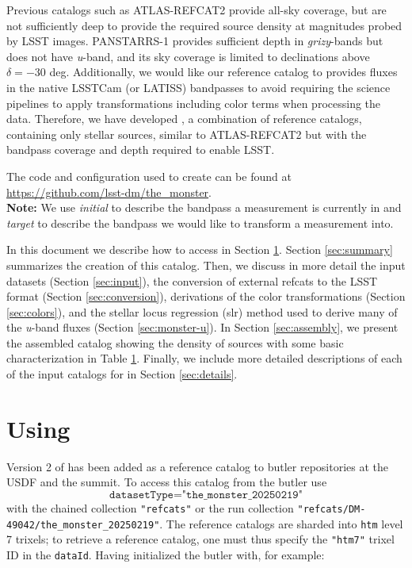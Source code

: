Previous catalogs such as ATLAS-REFCAT2 \citep{Tonry:2018} provide all-sky coverage, but are not sufficiently deep to provide the required source density at magnitudes probed by LSST images.
PANSTARRS-1\citep[PS1;][]{Chambers:2016} provides sufficient depth in \emph{grizy}-bands but does not have \emph{u}-band, and its sky coverage is limited to declinations above $\delta = -30$ deg.
Additionally, we would like our reference catalog to provides fluxes in the native LSSTCam (or LATISS) bandpasses to avoid requiring the science pipelines to apply transformations including color terms when processing the data.
Therefore, we have developed \monster, a combination of reference catalogs, containing only stellar sources, similar to ATLAS-REFCAT2 but with the bandpass coverage and depth required to enable LSST.

The code and configuration used to create \monster can be found at \url{https://github.com/lsst-dm/the_monster}.\\

\textbf{Note:} We use \emph{initial} to describe the bandpass a measurement is currently in and \emph{target} to describe the bandpass we would like to transform a measurement into.

In this document we describe how to access \monster in Section \ref{sec:using}. Section \ref{sec:summary} summarizes the creation of this catalog. 
Then, we discuss in more detail the input datasets (Section \ref{sec:input}), the conversion of external refcats to the LSST format (Section \ref{sec:conversion}), derivations of the color transformations (Section \ref{sec:colors}), and the stellar locus regression (slr) method used to derive many of the \emph{u}-band fluxes (Section \ref{sec:monster-u}).
In Section \ref{sec:assembly}, we present the assembled catalog showing the density of sources with some basic characterization in Table \hyperref[tab:summary]{1}.
Finally, we include more detailed descriptions of each of the input catalogs for \monster in Section \ref{sec:details}.

\section{Using \monster}
\label{sec:using}
Version 2 of \monster has been added as a reference catalog to butler repositories at the USDF and the summit.
To access this catalog from the butler use
$$\texttt{datasetType="the\_monster\_20250219"}$$
with the chained collection \texttt{"refcats"} or the run collection \texttt{"refcats/DM-49042/the\_monster\_20250219"}.
The reference catalogs are sharded into \texttt{htm} level 7 trixels; to retrieve a reference catalog, one must thus specify the \texttt{"htm7"} trixel ID in the \texttt{dataId}. Having initialized the butler with, for example:

